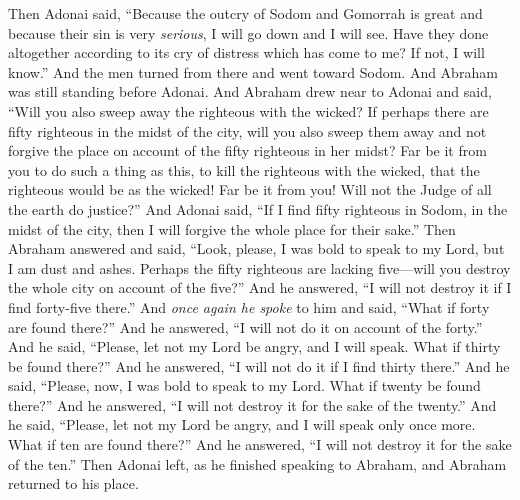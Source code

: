 \begin{biblechapter}
\verse Then Adonai said, “Because the outcry of Sodom and Gomorrah is great and because their sin is very \textit{serious},
\verse I will go down and I will see. Have they done altogether according to its cry of distress which has come to me? If not, I will know.”
 And the men turned from there and went toward Sodom. And Abraham was still standing before Adonai.
\verse And Abraham drew near to Adonai and said, “Will you also sweep away the righteous with the wicked?
\verse If perhaps there are fifty righteous in the midst of the city, will you also sweep them away and not forgive the place on account of the fifty righteous in her midst?
\verse Far be it from you to do such a thing as this, to kill the righteous with the wicked, that the righteous would be as the wicked! Far be it from you! Will not the Judge of all the earth do justice?”
\verse And Adonai said, “If I find fifty righteous in Sodom, in the midst of the city, then I will forgive the whole place for their sake.”
\verse Then Abraham answered and said, “Look, please, I was bold to speak to my Lord, but I am dust and ashes.
\verse Perhaps the fifty righteous are lacking five—will you destroy the whole city on account of the five?” And he answered, “I will not destroy it if I find forty-five there.”
\verse And \textit{once again he spoke} to him and said, “What if forty are found there?” And he answered, “I will not do it on account of the forty.”
\verse And he said, “Please, let not my Lord be angry, and I will speak. What if thirty be found there?” And he answered, “I will not do it if I find thirty there.”
\verse And he said, “Please, now, I was bold to speak to my Lord. What if twenty be found there?” And he answered, “I will not destroy it for the sake of the twenty.”
\verse And he said, “Please, let not my Lord be angry, and I will speak only once more. What if ten are found there?” And he answered, “I will not destroy it for the sake of the ten.”
\verse Then Adonai left, as he finished speaking to Abraham, and Abraham returned to his place.
\end{biblechapter}

